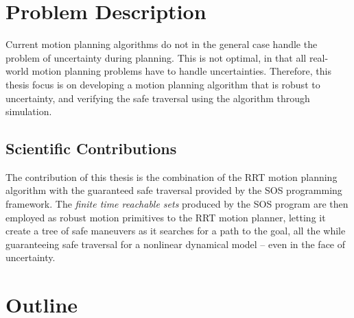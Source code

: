 \section{Problem Description}

Current motion planning algorithms do not in the general case handle the problem
of uncertainty during planning. This is not optimal, in that all real-world
motion planning problems have to handle uncertainties. Therefore, this thesis
focus is on developing a motion planning algorithm that is robust to
uncertainty, and verifying the safe traversal using the algorithm through
simulation.


\subsection{Scientific Contributions}

The contribution of this thesis is the combination of the \ac{RRT} motion
planning algorithm with the guaranteed safe traversal provided by the \ac{SOS}
programming framework. The \textit{finite time reachable sets} produced by the
\ac{SOS} program are then employed as robust motion primitives to the \ac{RRT}
motion planner, letting it create a tree of safe maneuvers as it searches for a
path to the goal, all the while guaranteeing safe traversal for a nonlinear
dynamical model -- even in the face of uncertainty.


\section{Outline}

